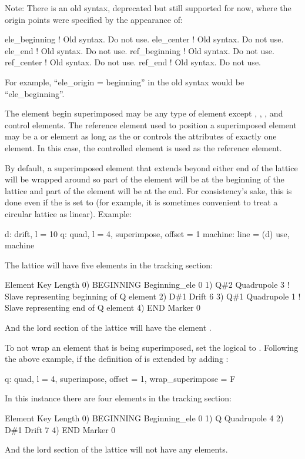 Note: There is an old syntax, deprecated but still supported for now, where the origin points were
specified by the appearance of:
\begin{example}
  ele_beginning         ! Old syntax. Do not use.
  ele_center            ! Old syntax. Do not use.
  ele_end               ! Old syntax. Do not use.
  ref_beginning         ! Old syntax. Do not use.
  ref_center            ! Old syntax. Do not use.
  ref_end               ! Old syntax. Do not use.
\end{example}
For example, ``ele_origin = beginning'' in the old syntax would be ``ele_beginning''.

The element begin superimposed may be any type of element except , ,
, and  control elements. The reference element used to position a
superimposed element may be a  or  element as long as the  or
 controls the attributes of exactly one element. In this case, the controlled element is
used as the reference element.

By default, a superimposed element that extends beyond either end of the lattice will be wrapped
around so part of the element will be at the beginning of the lattice and part of the element will
be at the end. For consistency's sake, this is done even if the  is set to 
(for example, it is sometimes convenient to treat a circular lattice as linear). Example:
\begin{example}
  d: drift, l = 10
  q: quad, l = 4, superimpose, offset = 1
  machine: line = (d)
  use, machine
\end{example}
The lattice will have five elements in the tracking section:
\begin{example}
        Element    Key             Length
  0)    BEGINNING  Beginning_ele   0
  1)    Q{\#}2        Quadrupole      3   ! Slave representing beginning of Q element
  2)    D{\#}1        Drift           6
  3)    Q{\#}1        Quadrupole      1   ! Slave representing end of Q element
  4)    END        Marker          0
\end{example}
And the lord section of the lattice will have the element . 

To not wrap an element that is being superimposed, set the  logical to .
Following the above example, if the definition of is extended by adding :
\begin{example}
  q: quad, l = 4, superimpose, offset = 1, wrap_superimpose = F
\end{example}
In this instance there are four elements in the tracking section:
\begin{example}
        Element    Key             Length
  0)    BEGINNING  Beginning_ele   0
  1)    Q          Quadrupole      4    
  2)    D{\#}1        Drift           7
  4)    END        Marker          0
\end{example}
And the lord section of the lattice will not have any elements.

